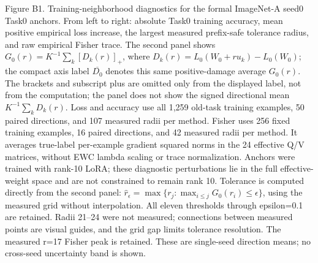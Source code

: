 \caption{Figure B1. Training-neighborhood diagnostics for the formal ImageNet-A seed0 Task0 anchors. From left to right: absolute Task0 training accuracy, mean positive empirical loss increase, the largest measured prefix-safe tolerance radius, and raw empirical Fisher trace. The second panel shows $G_0(r)=K^{-1}\sum_k[D_k(r)]_+$, where $D_k(r)=L_0(W_0+ru_k)-L_0(W_0)$; the compact axis label $\overline{D_0}$ denotes this same positive-damage average $G_0(r)$. The brackets and subscript plus are omitted only from the displayed label, not from the computation; the panel does not show the signed directional mean $K^{-1}\sum_k D_k(r)$. Loss and accuracy use all 1,259 old-task training examples, 50 paired directions, and 107 measured radii per method. Fisher uses 256 fixed training examples, 16 paired directions, and 42 measured radii per method. It averages true-label per-example gradient squared norms in the 24 effective Q/V matrices, without EWC lambda scaling or trace normalization. Anchors were trained with rank-10 LoRA; these diagnostic perturbations lie in the full effective-weight space and are not constrained to remain rank 10. Tolerance is computed directly from the second panel: $\hat r_\epsilon=\max\{r_j:\max_{i\leq j}G_0(r_i)\leq\epsilon\}$, using the measured grid without interpolation. All eleven thresholds through epsilon=0.1 are retained. Radii 21–24 were not measured; connections between measured points are visual guides, and the grid gap limits tolerance resolution. The measured r=17 Fisher peak is retained. These are single-seed direction means; no cross-seed uncertainty band is shown.}
